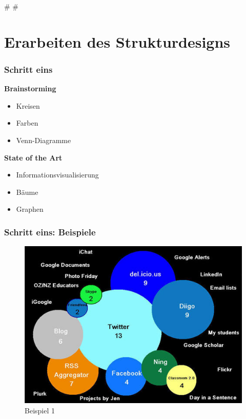 
\def\mytitle{File Network: Strukturdesign}
\def\myauthor{Anastasia Kazakova, Bengt Lüers}
\def\latexmode{beamer}
\def\latexxslt{beamer}
\def\theme{keynote-IntSysTheme}


\# \#

\section{Erarbeiten des Strukturdesigns}
\label{erarbeitendesstrukturdesigns}

\begin{frame}

\frametitle{Schritt eins}
\label{schritteins}

\textbf{Brainstorming}

\begin{itemize}
\item Kreisen

\item Farben

\item Venn-Diagramme

\end{itemize}

\textbf{State of the Art}

\begin{itemize}
\item Informationsvisualisierung

\item Bäume

\item Graphen

\end{itemize}

\end{frame}

\begin{frame}

\frametitle{Schritt eins: Beispiele}
\label{schritteins:beispiele}

\begin{figure}[htbp]
\centering
\includegraphics[keepaspectratio,width=\textwidth,height=0.75\textheight]{s1_bsp1.jpg}
\caption{Beispiel 1}
\label{}
\end{figure}


\end{frame}

